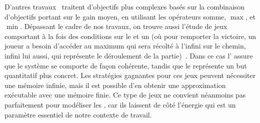 D'autres travaux~\cite{velner12b} traitent d'objectifs plus complexes basés sur la combinaison d'objectifs portant sur le gain moyen, en utilisant les opérateurs somme, $\max$, et $\min$.
Dépassant le cadre de nos travaux, on trouve aussi l'étude de jeux comportant à la fois des conditions sur le  et un  (où pour remporter la victoire, un joueur a besoin d'accéder au  maximum qui sera récolté à l'infini sur le chemin, infini lui aussi, qui représente le déroulement de la partie)~\cite{chatterjee05}.
Dans ce cas l' assure que le système se comporte de façon cohérente, tandis que le  représente un but quantitatif plus concret.
Les stratégies gagnantes pour ces jeux peuvent nécessiter une mémoire infinie, mais il est possible d'en obtenir une approximation exécutable avec une mémoire finie.
Ce type de jeux ne convient néanmoins pas parfaitement pour modéliser les \rcs, car ils laissent de côté l'énergie qui est un paramètre essentiel de notre contexte de travail.
